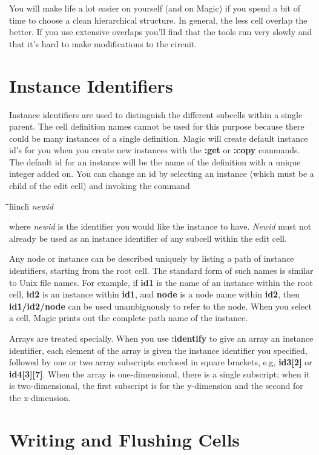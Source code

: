 \documentclass[letterpaper,twoside,12pt]{article}
\def\hinch{\hspace*{0.5in}}
\def\starti{\begin{center}\begin{tabbing}\hinch\=\hinch\=\hinch\=hinch\hinch\=\kill}
\def\endi{\end{tabbing}\end{center}}
\def\ii{\>\>\>}
\begin{document}
You will make life a lot easier on yourself (and on Magic)
if you spend a bit of time to choose a clean hierarchical structure.
In general, the less cell overlap the better.  If you use extensive
overlaps you'll find that the tools run very slowly and that it's
hard to make modifications to the circuit.

\section{Instance Identifiers}

Instance identifiers are used to distinguish the different subcells
within a single parent.  The cell definition names cannot be
used for this purpose because there could be many instances
of a single definition.  Magic will create default instance
id's for you when you create new instances with the {\bfseries :get}
or {\bfseries :copy} commands.  The default id for an instance will
be the name of the definition with a unique integer added on.
You can change an id by selecting
an instance (which must be a child of the edit cell) and invoking the command

\starti
   \ii {\bfseries :identify} {\itshape newid}
\endi

where {\itshape newid} is the identifier you would like the instance
to have.  {\itshape Newid} must not already be used as an instance
identifier of any subcell within the edit cell.

Any node or instance can be described uniquely by listing a
path of instance identifiers, starting from the root cell.  The
standard form of such names is similar to Unix file names.  For
example, if {\bfseries id1} is the name of an instance within the
root cell, {\bfseries id2} is an instance within {\bfseries id1}, and
{\bfseries node} is a node name within {\bfseries id2}, then
{\bfseries id1/id2/node} can be used unambiguously to refer to the node.
When you select a cell, Magic prints out the complete path name
of the instance.

Arrays are treated specially.  When you use {\bfseries :identify} to
give an array an instance identifier, each element of the array
is given the instance identifier you specified, followed
by one or two array subscripts enclosed in square brackets,
e.g, {\bfseries id3[2]} or {\bfseries id4[3][7]}.  When the array is
one-dimensional, there is a single subscript; when it is
two-dimensional, the first subscript is for the y-dimension
and the second for the x-dimension.

\section{Writing and Flushing Cells}
\end{document}
